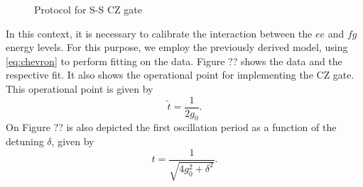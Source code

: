 \begin{figure}
    \centering
    
    \vspace{-1cm}
    \caption{Protocol for S-S CZ gate}
    \label{fig:SS_CZ}
\end{figure}

In this context, it is necessary to calibrate the interaction between the $ee$ and $fg$ energy levels.
For this purpose, we employ the previously derived model, using \cref{eq:chevron} to perform fitting on the data.
Figure ?? shows the data and the respective fit.
It also shows the operational point for implementing the CZ gate.
This operational point is given by
\begin{equation}
    \widetilde{t} = \frac{1}{2 g_0}.
\end{equation}
On Figure ?? is also depicted the first oscillation period as a function of the detuning $\delta$, given by
\begin{equation}
    t = \frac{1}{\sqrt{4 g_0^2 + \delta^2}} . 
\end{equation}